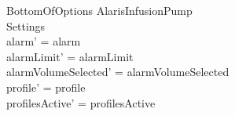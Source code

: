 \begin{schema}{BottomOfOptions}
	\Delta AlarisInfusionPump\\
	 Settings\\
	\where
	alarm' = alarm\\
	alarmLimit' = alarmLimit\\
	alarmVolumeSelected' = alarmVolumeSelected\\
	profile' = profile\\
	profilesActive' = profilesActive\\  
	  

\end{schema}
